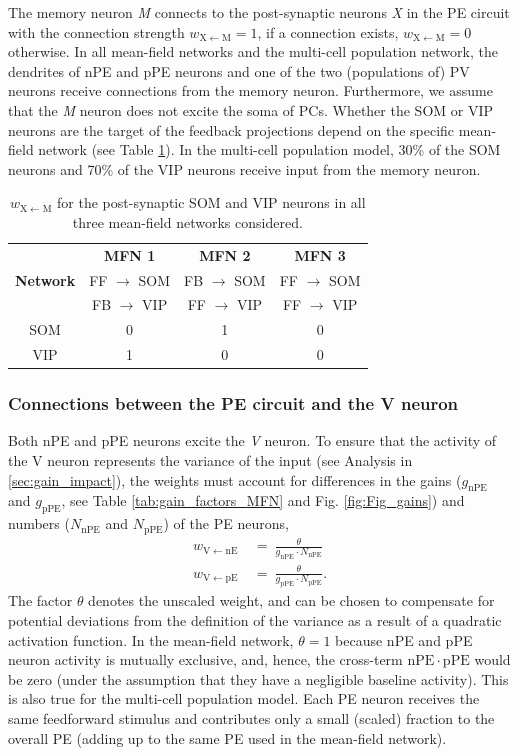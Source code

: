\documentclass[10pt,a4paper]{article}
\begin{document}
The memory neuron \textit{M} connects to the post-synaptic neurons \textit{X} in the PE circuit with the connection strength $w_\mathrm{X\leftarrow M} = 1$, if a connection exists, $w_\mathrm{X\leftarrow M} = 0$ otherwise. In all mean-field networks and the multi-cell population network, the dendrites of nPE and pPE neurons and one of the two (populations of) PV neurons receive connections from the memory neuron. Furthermore, we assume that the \textit{M} neuron does not excite the soma of PCs. Whether the SOM or VIP neurons are the target of the feedback projections depend on the specific mean-field network (see Table \ref{tab:wXM}). In the multi-cell population model, 30\% of the SOM neurons and 70\% of the VIP neurons receive input from the memory neuron.
%
\begin{table}[h!]
\centering
\begin{tabular}{ |c|c|c|c|  }
\hline
 & \textbf{MFN 1} & \textbf{MFN 2} & \textbf{MFN 3}  \\
\textbf{Network} & FF $\rightarrow$ SOM  & FB $\rightarrow$ SOM  & FF $\rightarrow$ SOM  \\
 & FB $\rightarrow$ VIP  & FF $\rightarrow$ VIP  & FF $\rightarrow$ VIP  \\
\hline
\hline
SOM & 0 & 1 & 0\\
VIP & 1 & 0 & 0 \\
\hline
\end{tabular}
\caption{\footnotesize{$w_\mathrm{X\leftarrow M}$ for the post-synaptic SOM and VIP neurons in all three mean-field networks considered.}}
\label{tab:wXM}
\end{table}
%

\subsubsection{Connections between the PE circuit and the V neuron}
%
Both nPE and pPE neurons excite the \textit{V} neuron. To ensure that the activity of the V neuron represents the variance of the input (see Analysis in \ref{sec:gain_impact}), the weights must account for differences in the gains ($g_\mathrm{nPE}$ and $g_\mathrm{pPE}$, see Table \ref{tab:gain_factors_MFN} and Fig. \ref{fig:Fig_gains}) and numbers ($N_\mathrm{nPE}$ and $N_\mathrm{pPE}$) of the PE neurons,
%
\begin{align*}
w_\mathrm{V\leftarrow nE}\  &=\ \frac{\theta}{g_\mathrm{nPE} \cdot N_\mathrm{nPE}} \nonumber\\
w_\mathrm{V\leftarrow pE}\  &=\ \frac{\theta}{g_\mathrm{pPE} \cdot N_\mathrm{pPE}}.
\end{align*}
%
The factor $\theta$ denotes the unscaled weight, and can be chosen to compensate for potential  deviations from the definition of the variance as a result of a quadratic activation function. In the mean-field network, $\theta = 1$ because nPE and pPE neuron activity is mutually exclusive, and, hence, the cross-term $\mathrm{nPE}\cdot\mathrm{pPE}$ would be zero (under the assumption that they have a negligible baseline activity). This is also true for the multi-cell population model. Each PE neuron receives the same feedforward stimulus and contributes only a small (scaled) fraction to the overall PE (adding up to the same PE used in the mean-field network).
\end{document}
